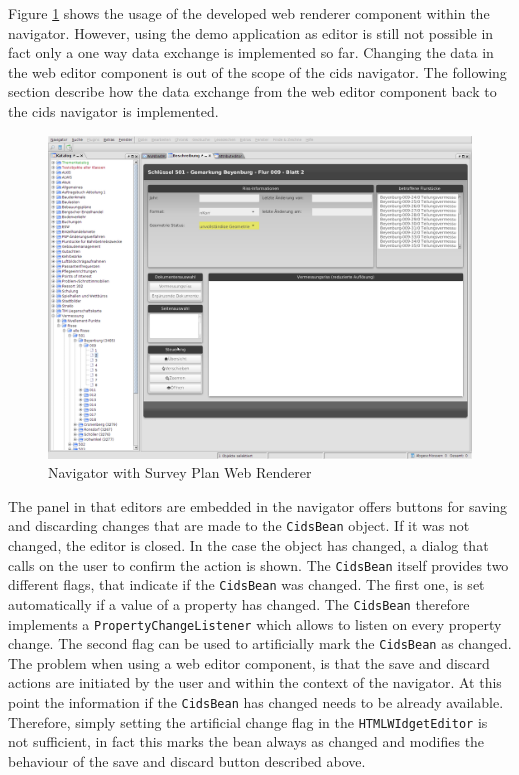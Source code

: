 Figure \ref{fig:nav_web_renderer} shows the usage of the developed web renderer component within the navigator.
However, using the demo application as editor is still not possible in fact  only a one way data exchange is implemented so far. 
Changing the data in the web editor component is out of the scope of the cids navigator. 
The following section describe how the data exchange from the web editor component back to the cids navigator is implemented.

\begin{figure}
	\centering	\includegraphics[width=1.0\textwidth]{./img/impl/navigator_web_renderer.png}
	\caption{Navigator with Survey Plan Web Renderer}
	\label{fig:nav_web_renderer}
\end{figure}

The panel in that editors are embedded in the navigator offers buttons for saving and discarding changes that are made to the \texttt{CidsBean} object.
If it was not changed, the editor is closed.
In the case the object has changed, a dialog that calls on the user to confirm the action is shown.
The \texttt{CidsBean} itself provides two different flags, that indicate if the \texttt{CidsBean} was changed.
The first one, is set automatically if a value of a property has changed.
The \texttt{CidsBean} therefore implements a \texttt{PropertyChangeListener} which allows to listen on every property change.
The second flag can be used to artificially mark the \texttt{CidsBean} as changed.
The problem when using a web editor component, is that the save and discard actions are initiated by the user and within the context of the navigator.
At this point the information if the \texttt{CidsBean} has changed needs to be already available.
Therefore, simply setting the artificial change flag in the \texttt{HTMLWIdgetEditor} is not sufficient, in fact this marks the bean always as changed and modifies the behaviour of the save and discard button described above.
 
